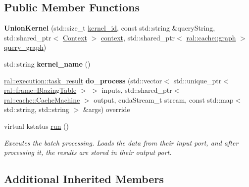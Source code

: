 \subsection*{Public Member Functions}
\begin{DoxyCompactItemize}
\item 
\mbox{\label{classral_1_1batch_1_1UnionKernel_ae149928419dfd006d7678883d6ced4e4}} 
{\bfseries Union\+Kernel} (std\+::size\+\_\+t \hyperlink{classral_1_1cache_1_1kernel_a2fd708656cb056a41ec635b8bdc4acfe}{kernel\+\_\+id}, const std\+::string \&query\+String, std\+::shared\+\_\+ptr$<$ \hyperlink{classblazingdb_1_1manager_1_1Context}{Context} $>$ \hyperlink{classral_1_1cache_1_1kernel_af0347d14d678cfa7205c1387746a2e1b}{context}, std\+::shared\+\_\+ptr$<$ \hyperlink{classral_1_1cache_1_1graph}{ral\+::cache\+::graph} $>$ \hyperlink{classral_1_1cache_1_1kernel_a5fbb02292aff165a28ef25e75f0d89bd}{query\+\_\+graph})
\item 
\mbox{\label{classral_1_1batch_1_1UnionKernel_a64277e4b4383799c83d1db2f7c7ca935}} 
std\+::string {\bfseries kernel\+\_\+name} ()
\item 
\mbox{\label{classral_1_1batch_1_1UnionKernel_a0511156c3e91a63d66b3b6b65eb23619}} 
\hyperlink{structral_1_1execution_1_1task__result}{ral\+::execution\+::task\+\_\+result} {\bfseries do\+\_\+process} (std\+::vector$<$ std\+::unique\+\_\+ptr$<$ \hyperlink{classral_1_1frame_1_1BlazingTable}{ral\+::frame\+::\+Blazing\+Table} $>$ $>$ inputs, std\+::shared\+\_\+ptr$<$ \hyperlink{classral_1_1cache_1_1CacheMachine}{ral\+::cache\+::\+Cache\+Machine} $>$ output, cuda\+Stream\+\_\+t stream, const std\+::map$<$ std\+::string, std\+::string $>$ \&args) override
\item 
virtual kstatus \hyperlink{classral_1_1batch_1_1UnionKernel_a30f9875564a6057113b2fd7debfdf7a9}{run} ()
\begin{DoxyCompactList}\small\item\em Executes the batch processing. Loads the data from their input port, and after processing it, the results are stored in their output port. \end{DoxyCompactList}\end{DoxyCompactItemize}
\subsection*{Additional Inherited Members}



